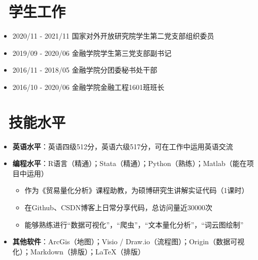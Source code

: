 \documentclass[11pt]{article}
\begin{document}
	
	
	
	
	
	
	
	
	
	\section{\makebox[\widthof{\faGraduationCap}][c]{\color{CVBlue}\faUsers}\ 学生工作}
	\begin{itemize}
		\item 2020/11 - 2021/11 \quad \quad \quad  国家对外开放研究院学生第二党支部组织委员		
		\item 2019/09 - 2020/06 \quad \quad \quad  金融学院学生第三党支部副书记
		\item 2016/11 - 2018/05 \quad \quad \quad  金融学院分团委秘书处干部
		\item 2016/10 - 2020/06 \quad \quad \quad  金融学院金融工程1601班班长
	\end{itemize}
	
	
	
	\section{\makebox[\widthof{\faGraduationCap}][c]{\color{CVBlue}\faWrench}\ 技能水平}
	
	\begin{itemize}
		\item \textbf{英语水平}：英语四级512分，英语六级517分，可在工作中运用英语交流
		
		\item \textbf{编程水平}：R语言（精通）；Stata（精通）；Python（熟练）；Matlab（能在项目中运用）
			\vspace{-3pt}
			\begin{itemize}
				\item  作为《贸易量化分析》课程助教，为硕博研究生讲解实证代码（1课时）
				\item  在Github、CSDN博客上日常分享代码，总访问量近30000次
				\item  能够熟练进行“数据可视化”，“爬虫”，“文本量化分析”，“词云图绘制”
			\vspace{-3pt}
			\end{itemize}
		
		\item \textbf{其他软件}：ArcGis（地图）；Visio / Draw.io（流程图）；Origin（数据可视化）；Markdown（排版）；\LaTeX{}（排版）
		
		
	\end{itemize}
	
	
	
\end{document}
